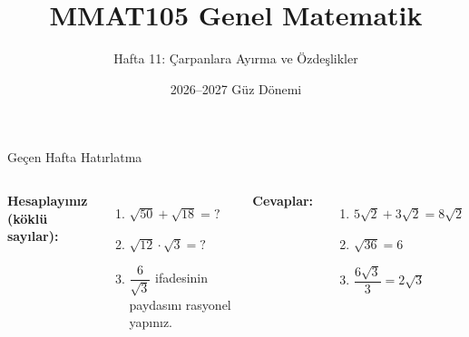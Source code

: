 \documentclass[aspectratio=169,11pt]{beamer}
\title[MMAT105 -- Hafta 11]{MMAT105 Genel Matematik}
\subtitle{Hafta 11: Çarpanlara Ayırma ve Özdeşlikler}
\author{}
\date{2026--2027 Güz Dönemi}
\begin{document}
\begin{frame}
\titlepage
\end{frame}


\begin{frame}{Geçen Hafta Hatırlatma}
\begin{columns}[t]
\textbf{Hesaplayınız (köklü sayılar):}
\begin{enumerate}
\item \(\sqrt{50}+\sqrt{18}=?\)
\item \(\sqrt{12}\cdot\sqrt{3}=?\)
\item \(\dfrac{6}{\sqrt{3}}\) ifadesinin paydasını rasyonel yapınız.
\end{enumerate}
\pause
\textbf{Cevaplar:}
\begin{enumerate}
\item \(5\sqrt{2}+3\sqrt{2}=8\sqrt{2}\)
\item \(\sqrt{36}=6\)
\item \(\dfrac{6\sqrt{3}}{3}=2\sqrt{3}\)
\end{enumerate}
\end{columns}
\end{frame}
\end{document}
